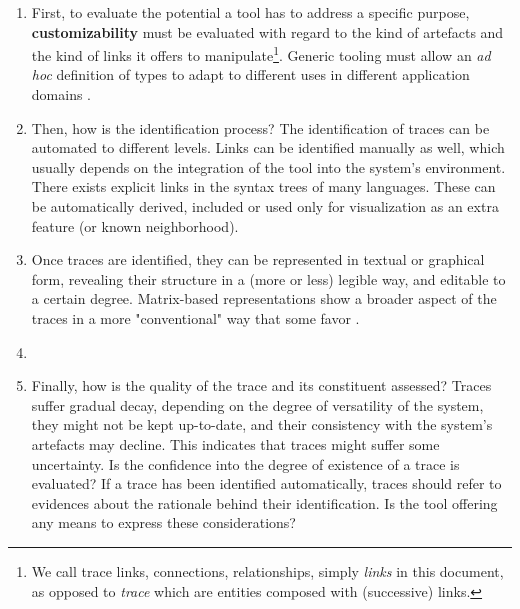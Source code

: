  
\begin{enumerate}
    \item First, to evaluate the potential a tool has to address a specific purpose, \textbf{customizability} must be evaluated with regard to the kind of artefacts and the kind of links it offers to manipulate\footnote{We call trace links, connections, relationships, simply \textit{links} in this document, as opposed to \textit{trace} which are entities composed with (successive) links.}. Generic tooling must allow an \textit{ad hoc} definition of types to adapt to different uses in different application domains \cite{maro2016_maintenance_factors_and_guidelines}. 
    
    \item Then, how is the identification process? The identification of traces can be automated to different levels. Links can be identified manually as well, which usually depends on the integration of the tool into the system's environment. 
    There exists explicit links in the syntax trees of many languages. These can be automatically derived, included or used only for visualization as an extra feature (or known neighborhood). 

    \item Once traces are identified, they can be represented in textual or graphical form, revealing their structure in a (more or less) legible way, and editable to a certain degree. Matrix-based representations show a broader aspect of the traces in a more "conventional" way that some favor \cite{li2013-trace-matrix-analyzer}. 
    

    \item {}
    
    \item Finally, how is the quality of the trace and its constituent assessed? Traces suffer gradual decay, depending on the degree of versatility of the system, they might not be kept up-to-date, and their consistency with the system's artefacts may decline. This indicates that traces might suffer some uncertainty. Is the confidence into the degree of existence of a trace is evaluated? If a trace has been identified automatically, traces should refer to evidences about the rationale behind their identification. Is the tool offering any means to express these considerations?
\end{enumerate}


